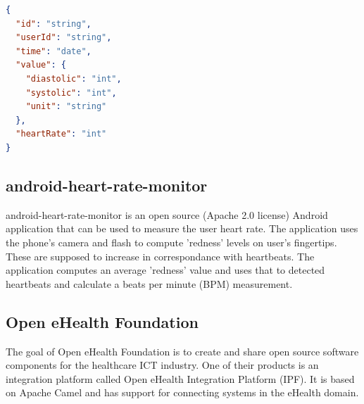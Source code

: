 

\begin{lstlisting}[language=JSON]
{
  "id": "string",
  "userId": "string",
  "time": "date",
  "value": {
    "diastolic": "int",
    "systolic": "int",
    "unit": "string"
  },
  "heartRate": "int"
}
\end{lstlisting}

\subsection{android-heart-rate-monitor} \nocite{AndroidHeartRateMonitor}
\label{subsec:hr}

android-heart-rate-monitor is an open source (Apache 2.0 license) Android application that can be used
to measure the user heart rate. The application uses the phone's camera and flash to compute
'redness' levels on user's fingertips. These are supposed to increase in correspondance with heartbeats.
The application computes an average 'redness' value and uses that to detected heartbeats and calculate
a beats per minute (BPM) measurement.


\subsection{Open eHealth Foundation} \nocite{OpenEHealthFoundation}

The goal of Open eHealth Foundation is to create and share open source software components for the healthcare ICT industry.
One of their products is an integration platform called Open eHealth Integration Platform (IPF).
It is based on Apache Camel and has support for connecting systems in the eHealth domain.



